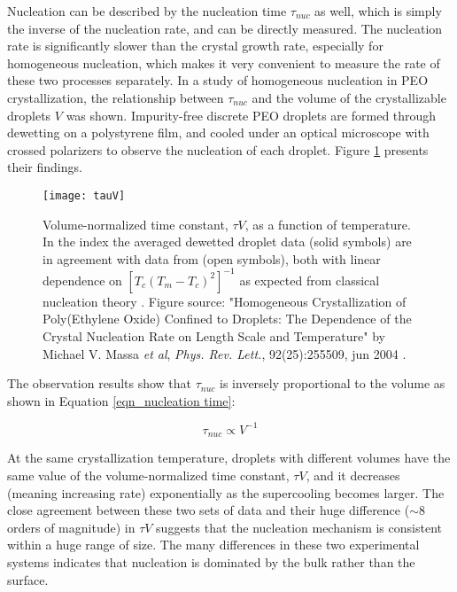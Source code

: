Nucleation can be described by the nucleation time $\tau _{nuc}$ as well, which is simply the inverse of the nucleation rate, and can be directly measured. The nucleation rate is significantly slower than the crystal growth rate, especially for homogeneous nucleation, which makes it very convenient to measure the rate of these two processes separately. In a study \cite{Massa2004} of homogeneous nucleation in PEO crystallization, the relationship between $\tau _{nuc}$ and the volume of the crystallizable droplets $V$ was shown. Impurity-free discrete PEO droplets are formed through dewetting on a polystyrene film, and cooled under an optical microscope with crossed polarizers to observe the nucleation of each droplet. Figure \ref{fig:tauV} presents their findings.

\begin{figure}[H]
\center
\texttt{[image: tauV]}
\caption[Volume-normalized time constant, $\tau V$, as a function of temperature.]{Volume-normalized time constant, $\tau V$, as a function of temperature. In the index the averaged dewetted droplet data (solid symbols) are in agreement with data from \cite{Rottele2003} (open symbols), both with linear dependence on $[T_{c}(T_{m}-T_{c})^{2}]^{-1}$ as expected from classical nucleation theory \cite{Strobl2007a}. Figure source: "Homogeneous Crystallization of Poly(Ethylene Oxide) Confined to Droplets: The Dependence of the Crystal Nucleation Rate on Length Scale and Temperature" by Michael V. Massa \textit{et al}, \textit{Phys. Rev. Lett.}, 92(25):255509, jun 2004 \cite{Yeates1984}.}
\label{fig:tauV}
\end{figure}

The observation results show that $\tau _{nuc}$ is inversely proportional to the volume as shown in Equation \ref{eqn_nucleation time}:

\begin{equation}
\label{eqn_nucleation time}
\tau _{nuc} \propto V^{-1}
\end{equation}

At the same crystallization temperature, droplets with different volumes have the same value of the volume-normalized time constant, $\tau V$, and it decreases (meaning increasing rate) exponentially as the supercooling becomes larger. The close agreement between these two sets of data and their huge difference ($\sim 8$ orders of magnitude) in $\tau V$ suggests that the nucleation mechanism is consistent within a huge range of size. The many differences in these two experimental systems indicates that nucleation is dominated by the bulk rather than the surface.

